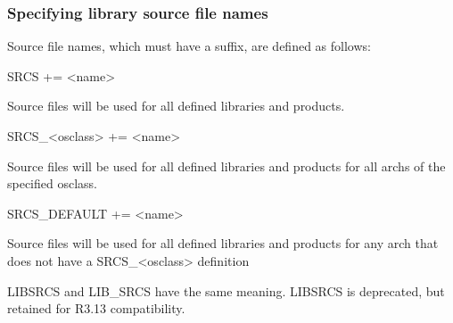 \subsubsection{Specifying library source file names}

Source file names, which must have a suffix, are defined as follows:

\begin{description}\item {}SRCS += \textless{}name\textgreater{}

Source files will be used for all defined libraries and products.

\item SRCS\_\textless{}osclass\textgreater{} += \textless{}name\textgreater{}

Source files will be used for all defined libraries and products for all archs of the specified osclass.

\item SRCS\_DEFAULT += \textless{}name\textgreater{}

Source files will be used for all defined libraries and products for any arch that does not have a 
SRCS\_\textless{}osclass\textgreater{} definition

\end{description}

LIBSRCS and LIB\_SRCS have the same meaning. LIBSRCS is deprecated, but retained for R3.13 compatibility.

